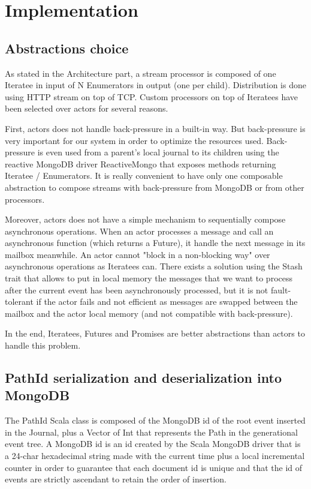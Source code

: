 \section{Implementation}
\label{sec:streamimplementation}

\subsection{Abstractions choice}

As stated in the Architecture part, a stream processor is composed of one Iteratee in input of N Enumerators in output (one per child). Distribution is done using HTTP stream on top of TCP. Custom processors on top of Iteratees have been selected over actors for several reasons.

First, actors does not handle back-pressure in a built-in way. But back-pressure is very important for our system in order to optimize the resources used. Back-pressure is even
used from a parent's local journal to its children using the reactive MongoDB driver ReactiveMongo  that exposes methods returning Iteratee / Enumerators. It is really
convenient to have only one composable abstraction to compose streams with back-pressure from MongoDB or from other processors. 

Moreover, actors does not have a simple mechanism to sequentially compose asynchronous operations. When an actor processes a message and call an asynchronous function (which
returns a Future), it handle the next message in its mailbox meanwhile. An actor cannot "block in a non-blocking way" over asynchronous operations as Iteratees can. There exists
a solution using the Stash trait  that allows to put in local memory the messages that we want to process after the current event has been asynchronously processed, but it is not fault-tolerant if the actor fails and not efficient as messages are swapped between the mailbox and the actor local memory (and not compatible with back-pressure).

In the end, Iteratees, Futures and Promises are better abstractions than actors to handle this problem.

\subsection{PathId serialization and deserialization into MongoDB}

The PathId Scala class is composed of the MongoDB id of the root event inserted in the Journal, plus a Vector of Int that represents the Path in the generational event tree.
A MongoDB id is an id created by the Scala MongoDB driver that is a 24-char hexadecimal string made with the current time plus a local incremental counter in order to guarantee that
each document id is unique and that the id of events are strictly ascendant to retain the order of insertion.


